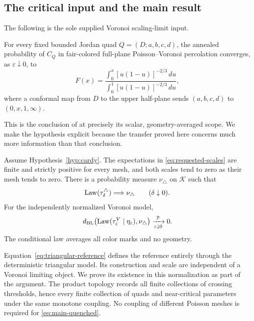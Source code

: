 \subsection{The critical input and the main result}

The following is the sole supplied Voronoi scaling-limit input.

\begin{hypothesis}
\label{hyp:cardy}
For every fixed bounded Jordan quad $Q=(D;a,b,c,d)$, the annealed
probability of $C_Q$ in fair-colored full-plane Poisson--Voronoi
percolation converges, as $\varepsilon\downarrow0$, to
\begin{equation}
 F(x)=\frac{\displaystyle\int_0^x [u(1-u)]^{-2/3}\,du}
 {\displaystyle\int_0^1 [u(1-u)]^{-2/3}\,du},
 \label{eq:cardy}
\end{equation}
where a conformal map from $D$ to the upper half-plane sends
$(a,b,c,d)$ to $(0,x,1,\infty)$.
\end{hypothesis}

This is the conclusion of \cite[Theorem~1.1]{supplied-cardy} at precisely
its scalar, geometry-averaged scope. We make the hypothesis explicit
because the transfer proved here concerns much more information than
that conclusion.

\begin{theorem}
\label{thm:main}
Assume Hypothesis~\ref{hyp:cardy}. The expectations in
\eqref{eq:requested-scales} are finite and strictly positive for every
mesh, and both scales tend to zero as their mesh tends to zero.
There is a probability measure $\nu_\triangle$ on $\mathcal K$ such that
\begin{equation}
 \operatorname{Law}(\tau_\delta^\triangle)\Longrightarrow\nu_\triangle
 \qquad(\delta\downarrow0).
 \label{eq:triangular-reference}
\end{equation}
For the independently normalized Voronoi model,
\begin{equation}
 d_{\mathrm{BL}}\bigl(\operatorname{Law}(\tau_\varepsilon^V\mid\eta_\varepsilon),
                 \nu_\triangle\bigr)
 \xrightarrow[\varepsilon\downarrow0]{\mathbb P}0.
 \label{eq:main-quenched}
\end{equation}
The conditional law averages all color marks and no geometry.
\end{theorem}

Equation~\eqref{eq:triangular-reference} defines the reference entirely
through the deterministic triangular model. Its construction and scale
are independent of a Voronoi limiting object. We prove its existence
in this normalization as part of the argument. The product topology
records all finite collections of crossing thresholds, hence every
finite collection of quads and near-critical parameters under the
same monotone coupling. No coupling of different Poisson meshes is
required for \eqref{eq:main-quenched}.

